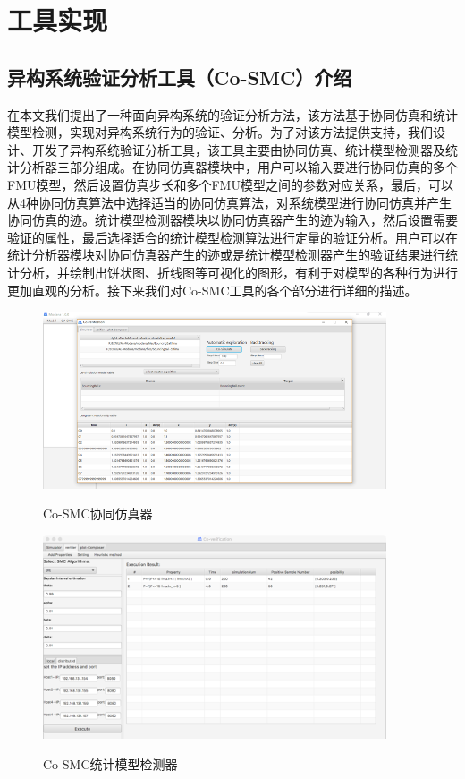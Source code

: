 \chapter{工具实现}
\label{ch5}

\section{异构系统验证分析工具（Co-SMC）介绍}
在本文我们提出了一种面向异构系统的验证分析方法，该方法基于协同仿真和统计模型检测，实现对异构系统行为的验证、分析。为了对该方法提供支持，我们设计、开发了异构系统验证分析工具，该工具主要由协同仿真、统计模型检测器及统计分析器三部分组成。在协同仿真器模块中，用户可以输入要进行协同仿真的多个FMU模型，然后设置仿真步长和多个FMU模型之间的参数对应关系，最后，可以从4种协同仿真算法中选择适当的协同仿真算法，对系统模型进行协同仿真并产生协同仿真的迹。统计模型检测器模块以协同仿真器产生的迹为输入，然后设置需要验证的属性，最后选择适合的统计模型检测算法进行定量的验证分析。用户可以在统计分析器模块对协同仿真器产生的迹或是统计模型检测器产生的验证结果进行统计分析，并绘制出饼状图、折线图等可视化的图形，有利于对模型的各种行为进行更加直观的分析。接下来我们对Co-SMC工具的各个部分进行详细的描述。
\begin{figure}[htbp]
	\centering
	{\includegraphics[width=4.0in]{fig/5/tool1.png}}
	\caption{Co-SMC协同仿真器}\label{tool-1}
\end{figure}
\begin{figure}[htbp]
	\centering
	{\includegraphics[width=4.0in]{fig/5/tool2.png}}
	\caption{Co-SMC统计模型检测器}\label{tool-2}
\end{figure}
